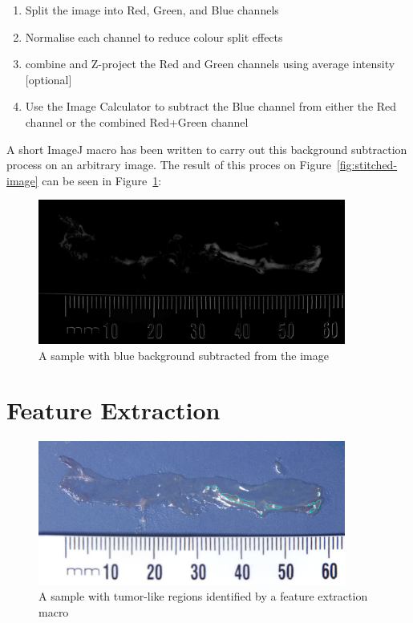 \documentclass[a4paper]{scrartcl}
\begin{document}
\begin{enumerate}
\item Split the image into Red, Green, and Blue channels
\item Normalise each channel to reduce colour split effects
\item combine and Z-project the Red and Green channels using average intensity [optional]
\item Use the Image Calculator to subtract the Blue channel from
  either the Red channel or the combined Red+Green channel
\end{enumerate}

A short ImageJ macro has been written to carry out this background
subtraction process on an arbitrary image. The result of this proces
on Figure~\ref{fig:stitched-image} can be seen in
Figure~\ref{fig:bg-subtract}:



\begin{figure}
  \centering
  \includegraphics[width=0.9\textwidth]{illustrations/small_R-B_DkrPaint.jpg}
  \caption{A sample with blue background subtracted from the image}
  \label{fig:bg-subtract}
\end{figure}

\section{Feature Extraction}

\begin{figure}
  \centering
  \includegraphics[width=0.9\textwidth]{illustrations/small_foundRegions_DkrPaint.jpg}
  \caption{A sample with tumor-like regions identified by a feature extraction macro}
  \label{fig:feature-extract}
\end{figure}
\end{document}
